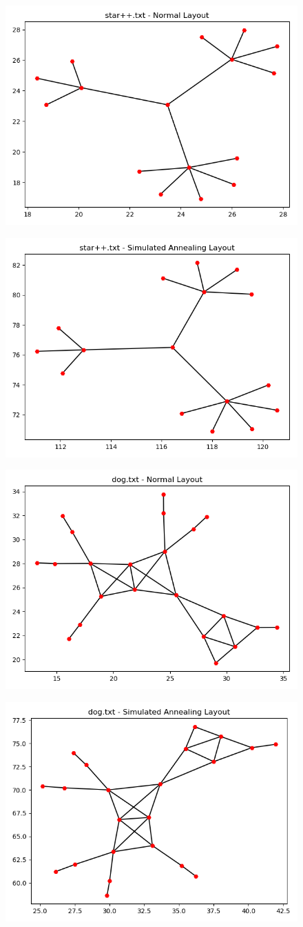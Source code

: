 \documentclass[10pt,a4paper]{article}
\begin{document}
\begin{enumerate}
\begin{figure}[H]
	\centering
	\includegraphics[width=0.5\linewidth]{../Scripts/star++_normal}
	\caption{}
	\label{fig:starpnormal}
\end{figure}

\begin{figure}[H]
	\centering
	\includegraphics[width=0.5\linewidth]{../Scripts/star++_annealing}
	\caption{}
	\label{fig:starpannealing}
\end{figure}

\begin{figure}[H]
	\centering
	\includegraphics[width=0.5\linewidth]{../Scripts/dog_normal}
	\caption{}
	\label{fig:dgnormal}
\end{figure}

\begin{figure}[H]
	\centering
	\includegraphics[width=0.5\linewidth]{../Scripts/dog_annealing}
	\caption{}
	\label{fig:dgannealing}
\end{figure}





\end{enumerate}
\end{document}
